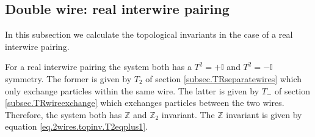 \subsection{Double wire: real interwire pairing} \label{subsec.2wires_CSinv_Delta12real}
In this subsection we calculate the topological invariants in the case of a real interwire pairing. 

For a real interwire pairing the system both has a $T^2 = +\mathbb{I}$ and $T^2 = -\mathbb{I}$ symmetry. The former is given by $T_2$ of section \ref{subsec.TRseparatewires} which only exchange particles within the same wire. The latter is given by $T_-$ of section \ref{subsec.TRwireexchange} which exchanges particles between the two wires. Therefore, the system both has $\mathbb{Z}$ and $\mathbb{Z}_2$ invariant. The $\mathbb{Z}$ invariant is given by equation \eqref{eq.2wires.topinv.T2eqplus1}.

